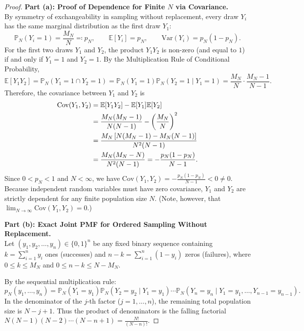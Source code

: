 \documentclass[11pt, letterpaper]{article}
\theoremstyle{definition}
\theoremstyle{remark}
\newcommand{\E}{\mathbb{E}}
\newcommand{\Prob}{\mathbb{P}}
\begin{document}
\begin{proof}
\textbf{Part (a): Proof of Dependence for Finite $N$ via Covariance.} \\ \relax
By symmetry of exchangeability in sampling without replacement, every draw $Y_i$ has the same marginal distribution as the first draw $Y_1$:
\[
    \Prob_N(Y_i = 1) = \frac{M_N}{N} \eqqcolon p_N, \qquad \E[Y_i] = p_N, \qquad \text{Var}(Y_i) = p_N(1 - p_N).
\]
For the first two draws $Y_1$ and $Y_2$, the product $Y_1 Y_2$ is non-zero (and equal to $1$) if and only if $Y_1 = 1$ and $Y_2 = 1$. By the Multiplication Rule of Conditional Probability,
\[
    \E[Y_1 Y_2] = \Prob_N(Y_1 = 1 \cap Y_2 = 1) = \Prob_N(Y_1 = 1) \Prob_N(Y_2 = 1 \mid Y_1 = 1) = \frac{M_N}{N} \cdot \frac{M_N - 1}{N - 1}.
\]
Therefore, the covariance between $Y_1$ and $Y_2$ is
\begin{align*}
    \text{Cov}(Y_1, Y_2) &= \E[Y_1 Y_2] - \E[Y_1]\E[Y_2] \\ \relax
    &= \frac{M_N(M_N - 1)}{N(N - 1)} - \left(\frac{M_N}{N}\right)^2 \\ \relax
    &= \frac{M_N\left[ N(M_N - 1) - M_N(N - 1) \right]}{N^2(N - 1)} \\ \relax
    &= \frac{M_N(M_N - N)}{N^2(N - 1)} = -\frac{p_N(1 - p_N)}{N - 1}.
\end{align*}
Since $0 < p_N < 1$ and $N < \infty$, we have $\text{Cov}(Y_1, Y_2) = -\frac{p_N(1-p_N)}{N-1} < 0 \neq 0$. Because independent random variables must have zero covariance, $Y_1$ and $Y_2$ are strictly dependent for any finite population size $N$. (Note, however, that $\lim_{N \to \infty} \text{Cov}(Y_1, Y_2) = 0$.)

\textbf{Part (b): Exact Joint PMF for Ordered Sampling Without Replacement.} \\ \relax
Let $(y_1, y_2, \dots, y_n) \in \{0, 1\}^n$ be any fixed binary sequence containing $k = \sum_{i=1}^n y_i$ ones (successes) and $n - k = \sum_{i=1}^n (1 - y_i)$ zeros (failures), where $0 \le k \le M_N$ and $0 \le n - k \le N - M_N$.

By the sequential multiplication rule:
\[
    p_N(y_1, \dots, y_n) = \Prob_N(Y_1 = y_1) \Prob_N(Y_2 = y_2 \mid Y_1 = y_1) \cdots \Prob_N(Y_n = y_n \mid Y_1 = y_1, \dots, Y_{n-1} = y_{n-1}).
\]
In the denominator of the $j$-th factor ($j = 1, \dots, n$), the remaining total population size is $N - j + 1$. Thus the product of denominators is the falling factorial $N(N - 1)(N - 2)\cdots (N - n + 1) = \frac{N!}{(N - n)!}$.


\end{proof}
\end{document}
